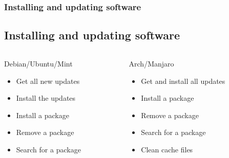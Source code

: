 \begin{frame}
	\frametitle{Installing and updating software}
	\subsection{Installing and updating software}
	
	\begin{columns}
		\begin{column}{.45\linewidth}
			\begin{block}{Debian/Ubuntu/Mint}
				\begin{itemize}
					\item Get all new updates 
					\item Install the updates 
					\item Install a package 
					\item Remove a package 
					\item Search for a package 
				\end{itemize}
			\end{block}
		\end{column}
		\hfill
		\begin{column}{.45\linewidth}
			\begin{block}{Arch/Manjaro}
				\begin{itemize}
					\item Get and install all updates 
					\item Install a package 
					\item Remove a package 
					\item Search for a package 
					\item Clean cache files 
				\end{itemize}
			\end{block}
		\end{column}
	\end{columns}
\end{frame}
